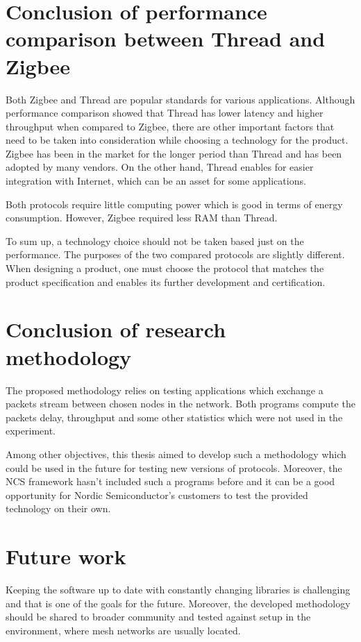 
\section{Conclusion of performance comparison between Thread and Zigbee}

Both Zigbee and Thread are popular standards for various applications.
Although performance comparison showed that Thread has lower latency and higher
throughput when compared to Zigbee,
there are other important factors that need to be taken into consideration
while choosing a technology for the product. Zigbee has been in the 
market for the longer period than Thread and has been adopted by many
vendors. On the other hand, Thread enables for easier integration
with Internet, which can be an asset for some applications.

Both protocols require little computing power which is good in terms
of energy consumption. However, Zigbee required less RAM than Thread.

To sum up, a technology choice should not be taken based just on
the performance. The purposes of the two compared protocols are slightly
different. When designing a product, one must choose the protocol that
matches the product specification and enables its further development and
certification.

\section{Conclusion of research methodology}

The proposed methodology relies on testing applications which exchange
a packets stream between chosen nodes in the network. Both programs
compute the packets delay, throughput and some other statistics which
were not used in the experiment.

Among other objectives, this thesis aimed to develop such a methodology
which could be used in the future for testing new versions of protocols.
Moreover, the NCS framework hasn't included such a programs before and 
it can be a good opportunity for Nordic Semiconductor's customers to
test the provided technology on their own.

\section{Future work}

Keeping
the software up to date with constantly changing libraries is
challenging and that is one of the goals for the future. Moreover,
the developed methodology should be shared to broader community
and tested against setup in the environment, where mesh networks
are usually located.
